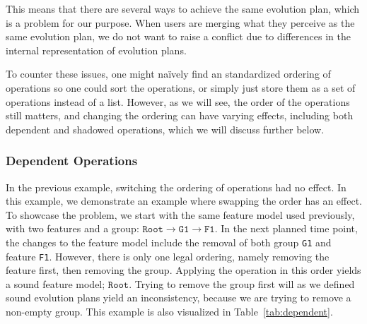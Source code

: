 \documentclass[a4paper,english]{ifimaster}
\begin{document}
This means that there are several ways to achieve the same evolution plan, which is a problem for our purpose. When users are merging what they perceive as the same evolution plan, we do not want to raise a conflict due to differences in the internal representation of evolution plans.

To counter these issues, one might naïvely find an standardized ordering of operations so one could sort the operations, or simply just store them as a set of operations instead of a list. However, as we will see, the order of the operations still matters, and changing the ordering can have varying effects, including both dependent and shadowed operations, which we will discuss further below.

\subsubsection{Dependent Operations}%
\label{ssub:dependent_operations}

In the previous example, switching the ordering of operations had no effect. In this example, we demonstrate an example where swapping the order has an effect. To showcase the problem, we start with the same feature model used previously, with two features and a group: $\texttt{Root} \rightarrow \texttt{G1} \rightarrow \texttt{F1}$. In the next planned time point, the changes to the feature model include the removal of both group \texttt{G1} and feature \texttt{F1}. However, there is only one legal ordering, namely removing the feature first, then removing the group. Applying the operation in this order yields a sound feature model; $\texttt{Root}$. Trying to remove the group first will as we defined sound evolution plans yield an inconsistency, because we are trying to remove a non-empty group. This example is also visualized in Table~\ref{tab:dependent}.
\end{document}
